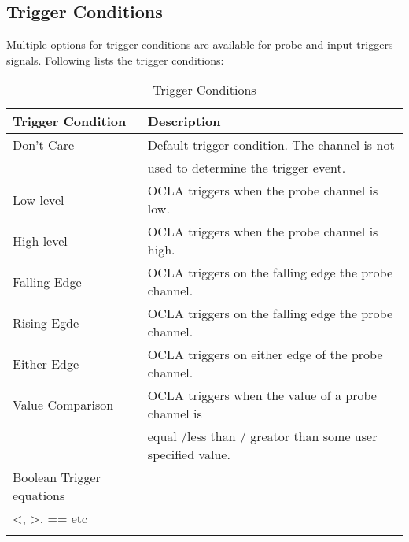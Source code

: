 \subsection*{\fontsize{14}{16}\selectfont Trigger Conditions}
Multiple options for trigger conditions are available for probe and input triggers signals. Following lists the trigger conditions:
\begin{longtable}{|l|l|}
	\hline
	\textbf{Trigger Condition} & \textbf{Description}                                                                                                \\ \hline
	\endfirsthead
	\endhead
	Don’t Care                 & Default trigger condition. The channel is not \\ & used to determine the trigger event.                                  \\ \hline
	Low level                  & OCLA triggers when the probe channel is low.                                                                              \\ \hline
	High level                 & OCLA triggers when the probe channel is high.                                                                             \\ \hline
	Falling Edge               & OCLA triggers on the falling edge the probe channel.                                                                          \\ \hline
	Rising Egde                & OCLA triggers on the falling edge the probe channel.                                                                           \\ \hline
	Either Edge                & OCLA triggers on either edge of the probe channel.                                                                \\ \hline
	Value Comparison           & OCLA triggers when the value of a probe channel is \\ & equal /less than / greator than some user specified value.       \\ \hline

	Boolean Trigger equations  & \begin{tabular}[c]{@{}l@{}}Advance Trigger Conditions AND, OR, \\  \textless{}, \textgreater{}, == etc\end{tabular} \\ \hline
	\caption{Trigger Conditions}
	\label{tab:Trigger-Condition}                                                                                                                    \\
\end{longtable}
